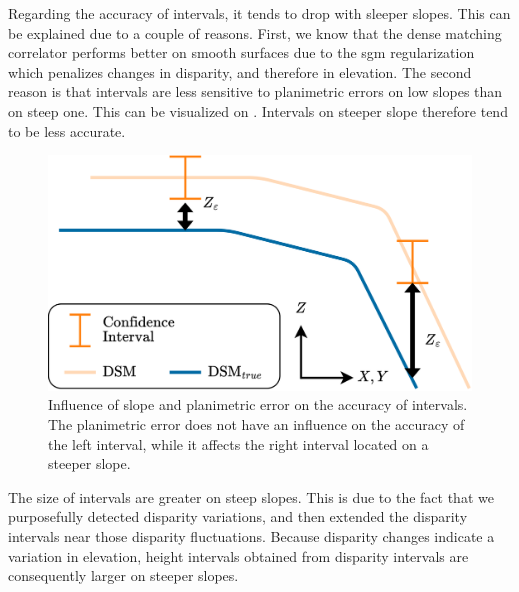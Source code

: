 Regarding the accuracy of intervals, it tends to drop with sleeper slopes. This can be explained due to a couple of reasons. First, we know that the dense matching correlator performs better on smooth surfaces due to the \acrshort{sgm} regularization which penalizes changes in disparity, and therefore in elevation. The second reason is that intervals are less sensitive to planimetric errors on low slopes than on steep one. This can be visualized on . Intervals on steeper slope therefore tend to be less accurate.

\begin{figure}
    \centering
    \includegraphics[width=0.7\linewidth]{Images/Chap_6/Slope_effect_error.png}
    \caption{Influence of slope and planimetric error on the accuracy of intervals. The planimetric error does not have an influence on the accuracy of the left interval, while it affects the right interval located on a steeper slope.}
    \label{fig:Slope_effect_error}
\end{figure}

The size of intervals are greater on steep slopes. This is due to the fact that we purposefully detected disparity variations, and then extended the disparity intervals near those disparity fluctuations. Because disparity changes indicate a variation in elevation, height intervals obtained from disparity intervals are consequently larger on steeper slopes. 

